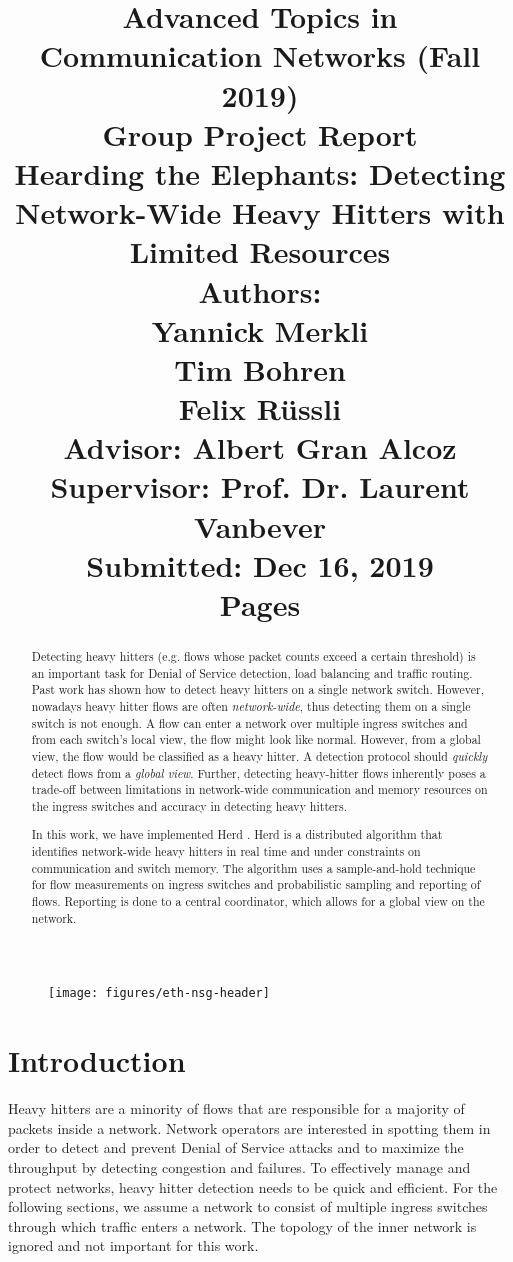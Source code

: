 \documentclass[11pt,oneside,a4paper]{article}
\title{
    \vspace*{0.0mm}
    \LARGE\bf\sf Advanced Topics in \\Communication Networks (Fall 2019)
    \vspace*{10.0mm} \\
    \Large\bf\sf Group Project Report \vspace*{30.0mm}\\
    \Huge\bf\sf Hearding the Elephants: Detecting Network-Wide Heavy Hitters with Limited Resources
    \vspace*{30.0mm} \\
    \normalsize
    \sf Authors:\\[5pt]
    \sf Yannick Merkli\\ [5pt]
    \sf Tim Bohren\\ [5pt]
    \sf Felix Rüssli \vspace*{5mm}\\
    \sf  Advisor: Albert Gran Alcoz \vspace*{5mm}\\
    \sf  Supervisor:  Prof. Dr. Laurent Vanbever \vspace*{20.0mm}\\
    \sf Submitted: Dec 16, 2019\\ [5pt]
    \sf \pageref{lastpage} Pages
}
\date{}
\begin{document}
\begin{figure}
    \texttt{[image: figures/eth-nsg-header]}
\end{figure}

\maketitle
\thispagestyle{empty}
\raggedbottom
\clearpage


\begin{abstract}
Detecting heavy hitters (e.g. flows whose packet counts exceed a certain threshold) is an important task for Denial of Service detection, load balancing and traffic routing. Past work has shown how to detect heavy hitters on a single network switch. However, nowadays heavy hitter flows are often \textit{network-wide}, thus detecting them on a single switch is not enough. A flow can enter a network over multiple ingress switches and from each switch's local view, the flow might look like normal. However, from a global view, the flow would be classified as a heavy hitter. A detection protocol should \textit{quickly} detect flows from a \textit{global view}. Further, detecting heavy-hitter flows inherently poses a trade-off between limitations in network-wide communication and memory resources on the ingress switches and accuracy in detecting heavy hitters. 

In this work, we have implemented Herd \cite{anon2019herd}. Herd is a distributed algorithm that identifies network-wide heavy hitters in real time and under constraints on communication and switch memory. The algorithm uses a sample-and-hold technique for flow measurements on ingress switches and probabilistic sampling and reporting of flows. Reporting is done to a central coordinator, which allows for a global view on the network.

\end{abstract}

\clearpage
\setcounter{tocdepth}{2}
\tableofcontents
\clearpage
{}

\section{Introduction}

Heavy hitters are a minority of flows that are responsible for a majority of packets inside a network. Network operators are interested in spotting them in order to detect and prevent Denial of Service attacks and to maximize the throughput by detecting congestion and failures. To effectively manage and protect networks, heavy hitter detection needs to be quick and efficient. For the following sections, we assume a network to consist of multiple ingress switches through which traffic enters a network. The topology of the inner network is ignored and not important for this work.
\end{document}
